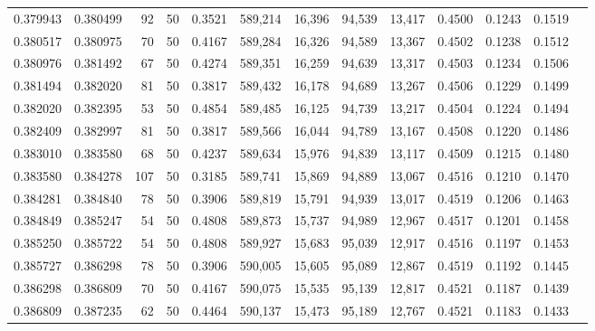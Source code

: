 \begin{tabular}{rrrrrrrrrrrrr}
0.379943 & 0.380499 &    92 &  50 &                                     0.3521 & 589,214 &  16,396 &  94,539 &  13,417 & 0.4500 & 0.1243 & 0.1519 \\
0.380517 & 0.380975 &    70 &  50 &                                     0.4167 & 589,284 &  16,326 &  94,589 &  13,367 & 0.4502 & 0.1238 & 0.1512 \\
0.380976 & 0.381492 &    67 &  50 &                                     0.4274 & 589,351 &  16,259 &  94,639 &  13,317 & 0.4503 & 0.1234 & 0.1506 \\
0.381494 & 0.382020 &    81 &  50 &                                     0.3817 & 589,432 &  16,178 &  94,689 &  13,267 & 0.4506 & 0.1229 & 0.1499 \\
0.382020 & 0.382395 &    53 &  50 &                                     0.4854 & 589,485 &  16,125 &  94,739 &  13,217 & 0.4504 & 0.1224 & 0.1494 \\
0.382409 & 0.382997 &    81 &  50 &                                     0.3817 & 589,566 &  16,044 &  94,789 &  13,167 & 0.4508 & 0.1220 & 0.1486 \\
0.383010 & 0.383580 &    68 &  50 &                                     0.4237 & 589,634 &  15,976 &  94,839 &  13,117 & 0.4509 & 0.1215 & 0.1480 \\
0.383580 & 0.384278 &   107 &  50 &                                     0.3185 & 589,741 &  15,869 &  94,889 &  13,067 & 0.4516 & 0.1210 & 0.1470 \\
0.384281 & 0.384840 &    78 &  50 &                                     0.3906 & 589,819 &  15,791 &  94,939 &  13,017 & 0.4519 & 0.1206 & 0.1463 \\
0.384849 & 0.385247 &    54 &  50 &                                     0.4808 & 589,873 &  15,737 &  94,989 &  12,967 & 0.4517 & 0.1201 & 0.1458 \\
0.385250 & 0.385722 &    54 &  50 &                                     0.4808 & 589,927 &  15,683 &  95,039 &  12,917 & 0.4516 & 0.1197 & 0.1453 \\
0.385727 & 0.386298 &    78 &  50 &                                     0.3906 & 590,005 &  15,605 &  95,089 &  12,867 & 0.4519 & 0.1192 & 0.1445 \\
0.386298 & 0.386809 &    70 &  50 &                                     0.4167 & 590,075 &  15,535 &  95,139 &  12,817 & 0.4521 & 0.1187 & 0.1439 \\
0.386809 & 0.387235 &    62 &  50 &                                     0.4464 & 590,137 &  15,473 &  95,189 &  12,767 & 0.4521 & 0.1183 & 0.1433 \\

\end{tabular}
